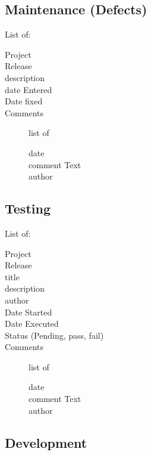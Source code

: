 \documentclass[SDSUThesis.tex]{subfiles}
\begin{document}
    \subsection{Maintenance (Defects)}
    List of:
    \begin{description}
      \item[Project] 
      \item[Release]
      \item[description]
      \item[date Entered]
      \item[Date fixed]
      \item[Comments] list of \\
      \begin{description}
        \item[date]
        \item[comment Text]
        \item[author]
      \end{description}
    \end{description}
    
    
    
    \subsection{Testing}
    
    List of:
    \begin{description}
      \item[Project] 
      \item[Release]
      \item[title]
      \item[description]
      \item[author]
      \item[Date Started]
      \item[Date Executed]
      \item[Status (Pending, pass, fail)]
      \item[Comments] list of \\
      \begin{description}
        \item[date]
        \item[comment Text]
        \item[author]
      \end{description}
    \end{description}
    
    \subsection{Development}
    
\end{document}
